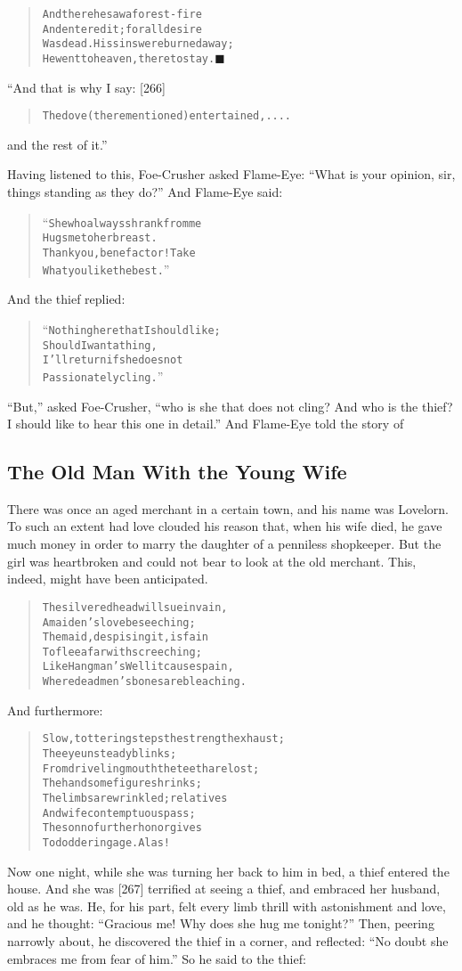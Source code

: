 \documentclass[article, twoside, 14pt]{memoir}
\newcommand{\qed}{\hfill \ensuremath{\blacksquare}}
\renewenvironment{verbatim}{%
\begin{quote}%
\vskip -10pt%
\begin{alltt}\normalfont\large}{\end{alltt}%
\end{quote}%
\vskip -10pt
} %
\begin{document}
\begin{verbatim}
And there he saw a forest-fire
And entered it; for all desire
Was dead. His sins were burned away;
He went to heaven, there to stay.\hyperref[s55]{\qed}
\end{verbatim}
“And that is why I say: [266]

\begin{verbatim}
The dove (there mentioned) entertained, ....
\end{verbatim}
and the rest of it.”

Having listened to this, Foe-Crusher asked Flame-Eye:
``What is your opinion, sir, things standing as they do?'' And
Flame-Eye said:

\begin{verbatim}
“She who always shrank from me
Hugs me to her breast.
Thank you, benefactor! Take
What you like the best.”
\end{verbatim}
And the thief replied:

\begin{verbatim}
“Nothing here that I should like;
Should I want a thing,
I'll return if she does not
Passionately cling.”
\end{verbatim}
``But,'' asked Foe-Crusher,
``who is she that does not cling? And who is the thief? I should like to hear this one in detail.''
And Flame-Eye told the story of

\subsection{The Old Man With the Young Wife}

\label{s56}

There was once an aged merchant in a certain town, and his name was
Lovelorn. To such an extent had love clouded his reason that, when
his wife died, he gave much money in order to marry the daughter of
a penniless shopkeeper. But the girl was heartbroken and could not
bear to look at the old merchant. This, indeed, might have been
anticipated.

\begin{verbatim}
The silvered head will sue in vain,
    A maiden's love beseeching;
The maid, despising it, is fain
    To flee afar with screeching;
Like Hangman's Well it causes pain,
    Where dead men's bones are bleaching.
\end{verbatim}
And furthermore:

\begin{verbatim}
Slow, tottering steps the strength exhaust;
    The eye unsteady blinks;
From driveling mouth the teeth are lost;
    The handsome figure shrinks;
The limbs are wrinkled; relatives
    And wife contemptuous pass;
The son no further honor gives
    To doddering age. Alas!
\end{verbatim}
Now one night, while she was turning her back to him in bed, a
thief entered the house. And she was [267] terrified at seeing a
thief, and embraced her husband, old as he was. He, for his part,
felt every limb thrill with astonishment and love, and he thought:
``Gracious me! Why does she hug me tonight?'' Then, peering
narrowly about, he discovered the thief in a corner, and reflected:
``No doubt she embraces me from fear of him.'' So he said to the
thief:
\end{document}
